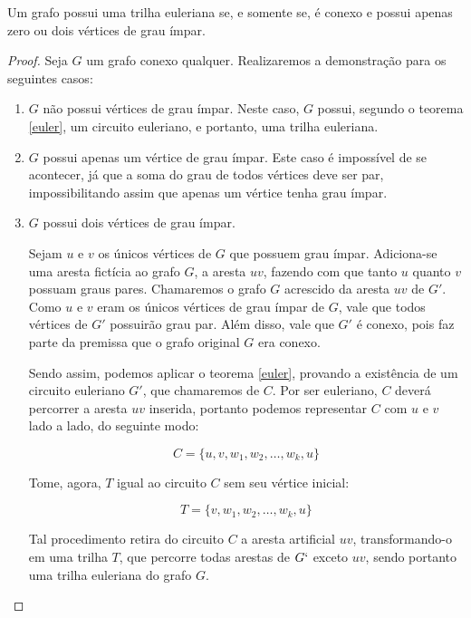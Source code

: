 \begin{corollary}
    Um grafo possui uma trilha euleriana se, e somente se, é conexo e possui apenas zero ou dois vértices de grau ímpar.
\end{corollary}

\begin{proof}
    Seja $G$ um grafo conexo qualquer. Realizaremos a demonstração para os seguintes casos:
    \begin{enumerate}
        \item $G$ não possui vértices de grau ímpar. Neste caso, $G$ possui, segundo o teorema \ref{euler}, um circuito euleriano, e portanto, uma trilha euleriana.
        
        \item $G$ possui apenas um vértice de grau ímpar. 
			Este caso é impossível de se acontecer, já que a soma do grau de todos vértices deve ser par, impossibilitando assim que apenas um vértice tenha grau ímpar.
        
        \item $G$ possui dois vértices de grau ímpar. 

			Sejam $u$ e $v$ os únicos vértices de $G$ que possuem grau ímpar.
			Adiciona-se uma aresta fictícia ao grafo $G$, a aresta $uv$, fazendo com que tanto $u$ quanto $v$ possuam graus pares. 
			Chamaremos o grafo $G$ acrescido da aresta $uv$ de $G'$.
			Como $u$ e $v$ eram os únicos vértices de grau ímpar de $G$, vale que todos vértices de $G'$ possuirão grau par. 
			Além disso, vale que $G'$ é conexo, pois faz parte da premissa que o grafo original $G$ era conexo.

			Sendo assim, podemos aplicar o teorema \ref{euler}, provando a existência de um circuito euleriano $G'$, que chamaremos de $C$.
            Por ser euleriano, $C$ deverá percorrer a aresta $uv$ inserida, portanto podemos representar $C$ com $u$ e $v$ lado a lado, do seguinte modo:
		
			\[
				C = \{u, v, w_1, w_2, \dots, w_k, u\}
			\]


            Tome, agora, $T$ igual ao circuito $C$ sem seu vértice inicial:

            \[
                T = \{v, w_1, w_2, \dots, w_k, u\}
			\]

            Tal procedimento retira do circuito $C$ a aresta artificial $uv$, transfor\-mando-o em uma trilha $T$, que percorre todas arestas de $G`$ exceto $uv$, sendo portanto uma trilha euleriana do grafo $G$.


\end{enumerate}
\end{proof}
